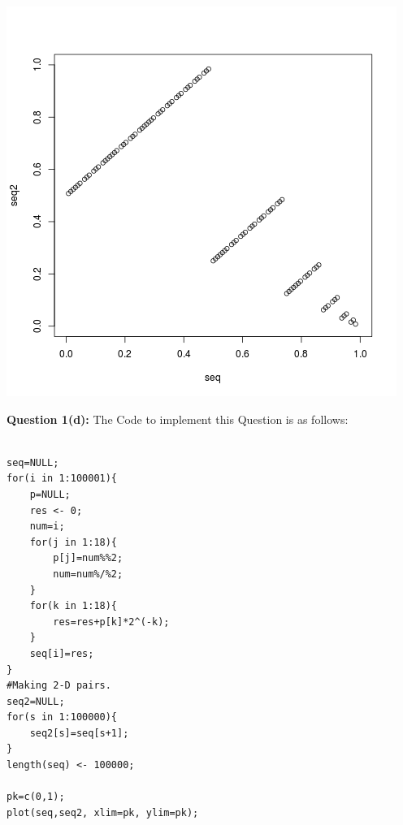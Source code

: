 \documentclass{article}
\begin{document}
\begin{center}
	\includegraphics{Question1_3.png}
\end{center}

\newpage
\textbf{\large Question 1(d):}
The Code to implement this Question is as follows:\\


\lstset {language=R}


\begin{lstlisting}

seq=NULL;
for(i in 1:100001){
	p=NULL;
	res <- 0;
	num=i;
	for(j in 1:18){
		p[j]=num%%2;
		num=num%/%2;
	}
	for(k in 1:18){
		res=res+p[k]*2^(-k);
	}
	seq[i]=res;
}
#Making 2-D pairs.
seq2=NULL;
for(s in 1:100000){
	seq2[s]=seq[s+1];
}
length(seq) <- 100000;

pk=c(0,1);
plot(seq,seq2, xlim=pk, ylim=pk);


\end{lstlisting}
\end{document}
